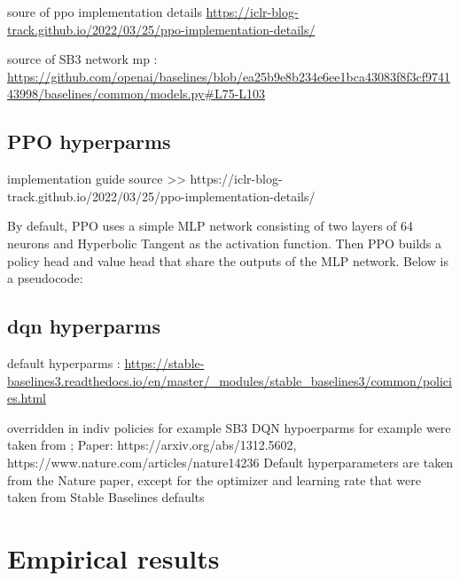 \documentclass[a4paper, 12pt]{article}
\begin{document}
soure of ppo implementation details \url{https://iclr-blog-track.github.io/2022/03/25/ppo-implementation-details/}

source of SB3 network mp : \url{https://github.com/openai/baselines/blob/ea25b9e8b234e6ee1bca43083f8f3cf974143998/baselines/common/models.py#L75-L103}

\subsection{PPO hyperparms}

implementation guide source >> https://iclr-blog-track.github.io/2022/03/25/ppo-implementation-details/

By default, PPO uses a simple MLP network consisting of two layers of 64 neurons and Hyperbolic Tangent as the activation function. Then PPO builds a policy head and value head that share the outputs of the MLP network. Below is a pseudocode:

\subsection{dqn hyperparms}


default hyperparms : \url{https://stable-baselines3.readthedocs.io/en/master/_modules/stable_baselines3/common/policies.html}

overridden in indiv policies for example 
SB3 DQN hypoerparms for example were taken from ;
Paper: https://arxiv.org/abs/1312.5602, https://www.nature.com/articles/nature14236
Default hyperparameters are taken from the Nature paper,
except for the optimizer and learning rate that were taken from Stable Baselines defaults




\section{Empirical results}
\end{document}
